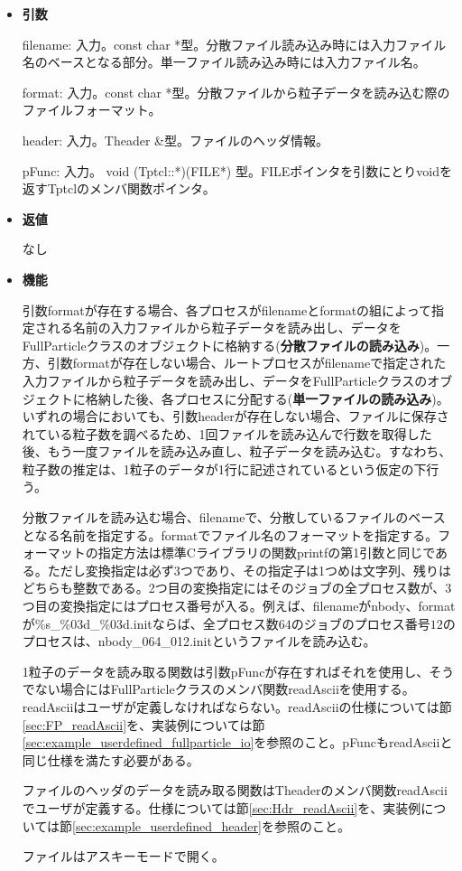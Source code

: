 \begin{itemize}

\item {\bf 引数}

filename: 入力。const char *型。分散ファイル読み込み時には入力ファイル名のベースとなる部分。単一ファイル読み込み時には入力ファイル名。

format: 入力。const char *型。分散ファイルから粒子データを読み込む際の
ファイルフォーマット。

header: 入力。Theader \&型。ファイルのヘッダ情報。

pFunc: 入力。 void (Tptcl::*)(FILE*) 型。FILEポインタを引数にとりvoidを返すTptclのメンバ関数ポインタ。

\item {\bf 返値}

なし

\item {\bf 機能}

引数formatが存在する場合、各プロセスがfilenameとformatの組によって指定される名前の入力ファイルから粒子データを読み出し、データをFullParticleクラスのオブジェクトに格納する(\textbf{分散ファイルの読み込み})。一方、引数formatが存在しない場合、ルートプロセスがfilenameで指定された入力ファイルから粒子データを読み出し、データをFullParticleクラスのオブジェクトに格納した後、各プロセスに分配する(\textbf{単一ファイルの読み込み})。いずれの場合においても、引数headerが存在しない場合、ファイルに保存されている粒子数を調べるため、1回ファイルを読み込んで行数を取得した後、もう一度ファイルを読み込み直し、粒子データを読み込む。すなわち、粒子数の推定は、1粒子のデータが1行に記述されているという仮定の下行う。


分散ファイルを読み込む場合、filenameで、分散しているファイルのベースとなる名前を指定する。formatでファイル名のフォーマットを指定する。フォーマットの指定方法は標準Cライブラリの関数printfの第1引数と同じである。ただし変換指定は必ず3つであり、その指定子は1つめは文字列、残りはどちらも整数である。2つ目の変換指定にはそのジョブの全プロセス数が、3つ目の変換指定にはプロセス番号が入る。例えば、filenameがnbody、formatが\%s\_\%03d\_\%03d.initならば、全プロセス数$64$のジョブのプロセス番号$12$のプロセスは、nbody\_064\_012.initというファイルを読み込む。

1粒子のデータを読み取る関数は引数pFuncが存在すればそれを使用し、そうでない場合にはFullParticleクラスのメンバ関数readAsciiを使用する。readAsciiはユーザが定義しなければならない。readAsciiの仕様については節\ref{sec:FP_readAscii}を、実装例については節\ref{sec:example_userdefined_fullparticle_io}を参照のこと。pFuncもreadAsciiと同じ仕様を満たす必要がある。

ファイルのヘッダのデータを読み取る関数はTheaderのメンバ関数readAsciiでユーザが定義する。仕様については節\ref{sec:Hdr_readAscii}を、実装例については節\ref{sec:example_userdefined_header}を参照のこと。

ファイルはアスキーモードで開く。

\end{itemize}


